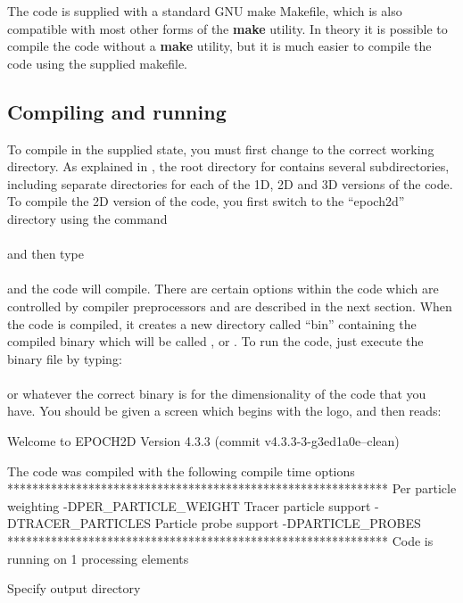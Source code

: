 The code is supplied with a standard GNU make Makefile, which is also
compatible with most other forms of the {\bf make} utility. In theory it is
possible to compile the code without a {\bf make} utility, but it is much
easier to compile the code using the supplied makefile.

\subsection{Compiling and running {\EPOCH}}

To compile {\EPOCH} in the supplied state, you must first change to the
correct working directory. As explained in , the
root directory for {\EPOCH} contains several subdirectories, including
separate directories for each of the 1D, 2D and 3D versions of the code.
To compile the 2D version of the code, you first switch to the ``epoch2d''
directory using the command\\
\indent{}\\
and then type\\
\indent{}\\
and the code will compile. There are certain options within the code which are
controlled by compiler preprocessors and are described in the next
section. When the code is compiled, it creates a new directory called ``bin''
containing the compiled binary which will be called ,
 or . To run the code, just execute the
binary file by typing:\\
\indent{}\\
or whatever the correct binary is for the dimensionality of the code that you
have. You should be given a screen which begins with the {\EPOCH} logo, and then
reads:
\begin{boxverbatim}
 Welcome to EPOCH2D Version 4.3.3   (commit v4.3.3-3-g3ed1a0e--clean)

 The code was compiled with the following compile time options
 *************************************************************
 Per particle weighting -DPER_PARTICLE_WEIGHT
 Tracer particle support -DTRACER_PARTICLES
 Particle probe support -DPARTICLE_PROBES
 *************************************************************
 Code is running on 1 processing elements

 Specify output directory
\end{boxverbatim}

